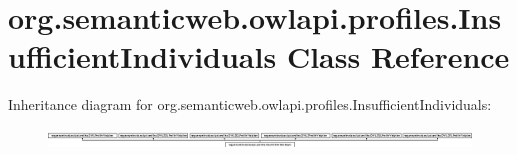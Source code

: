 \hypertarget{classorg_1_1semanticweb_1_1owlapi_1_1profiles_1_1_insufficient_individuals}{\section{org.\-semanticweb.\-owlapi.\-profiles.\-Insufficient\-Individuals Class Reference}
\label{classorg_1_1semanticweb_1_1owlapi_1_1profiles_1_1_insufficient_individuals}
}
Inheritance diagram for org.\-semanticweb.\-owlapi.\-profiles.\-Insufficient\-Individuals\-:\begin{figure}[H]
\begin{center}
\leavevmode
\includegraphics[height=0.544218cm]{classorg_1_1semanticweb_1_1owlapi_1_1profiles_1_1_insufficient_individuals}
\end{center}
\end{figure}
